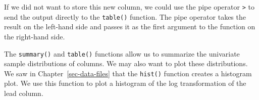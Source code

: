 \documentclass[
  letterpaper,
]{latex/krantz}
\makeatletter
\newenvironment{Shaded}{\begin{snugshade}}{\end{snugshade}}
\newcommand{\CommentTok}[1]{\textcolor[rgb]{0.37,0.37,0.37}{#1}}
\newcommand{\FunctionTok}[1]{\textcolor[rgb]{0.28,0.35,0.67}{#1}}
\newcommand{\NormalTok}[1]{\textcolor[rgb]{0.00,0.23,0.31}{#1}}
\newcommand{\OtherTok}[1]{\textcolor[rgb]{0.00,0.23,0.31}{#1}}
\newcommand{\SpecialCharTok}[1]{\textcolor[rgb]{0.37,0.37,0.37}{#1}}
\newcommand{\StringTok}[1]{\textcolor[rgb]{0.13,0.47,0.30}{#1}}
\newenvironment{kframe}{%
\medskip{}
\setlength{\fboxsep}{.8em}
 \def\at@end@of@kframe{}%
 \ifinner\ifhmode%
  \def\at@end@of@kframe{\end{minipage}}%
  \begin{minipage}{\columnwidth}%
 \fi\fi%
 \def\FrameCommand##1{\hskip\@totalleftmargin \hskip-\fboxsep
 \colorbox{shadecolor}{##1}\hskip-\fboxsep
     \hskip-\linewidth \hskip-\@totalleftmargin \hskip\columnwidth}%
 \MakeFramed {\advance\hsize-\width
   \@totalleftmargin\z@ \linewidth\hsize
   \@setminipage}}%
 {\par\unskip\endMakeFramed%
 \at@end@of@kframe}
\renewenvironment{Shaded}{\begin{kframe}}{\end{kframe}}
\makeatother
\begin{document}
\begin{Shaded}
\end{Shaded}

If we did not want to store this new column, we could use the pipe
operator \texttt{\textbar{}\textgreater{}} to send the output directly
to the \texttt{table()} function. The pipe operator takes the result on
the left-hand side and passes it as the first argument to the function
on the right-hand side.

\begin{Shaded}
\end{Shaded}

The \texttt{summary()} and \texttt{table()} functions allow us to
summarize the univariate sample distributions of columns. We may also
want to plot these distributions. We saw in Chapter~\ref{sec-data-files}
that the \texttt{hist()}
function creates a histogram plot. We use this
function to plot a histogram of the log transformation of the lead
column.

\begin{Shaded}
\end{Shaded}
\end{document}
